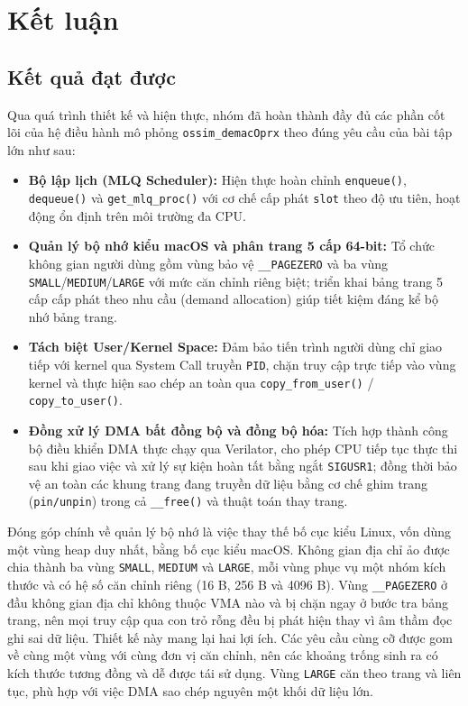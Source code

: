 \documentclass[12pt,a4paper]{article}
\begin{document}
	\section{Kết luận}
	\subsection*{Kết quả đạt được}
    Qua quá trình thiết kế và hiện thực, nhóm đã hoàn thành đầy đủ các phần cốt lõi của hệ điều hành mô phỏng \texttt{ossim\_demacOprx} theo đúng yêu cầu của bài tập lớn như sau:
    \begin{itemize}
        \item \textbf{Bộ lập lịch (MLQ Scheduler):} Hiện thực hoàn chỉnh \texttt{enqueue()}, \texttt{dequeue()} và \texttt{get\_mlq\_proc()} với cơ chế cấp phát \texttt{slot} theo độ ưu tiên, hoạt động ổn định trên môi trường đa CPU.
        \item \textbf{Quản lý bộ nhớ kiểu macOS và phân trang 5 cấp 64-bit:} Tổ chức không gian người dùng gồm vùng bảo vệ \texttt{\_\_PAGEZERO} và ba vùng \texttt{SMALL}/\texttt{MEDIUM}/\texttt{LARGE} với mức căn chỉnh riêng biệt; triển khai bảng trang 5 cấp cấp phát theo nhu cầu (demand allocation) giúp tiết kiệm đáng kể bộ nhớ bảng trang.
        \item \textbf{Tách biệt User/Kernel Space:} Đảm bảo tiến trình người dùng chỉ giao tiếp với kernel qua System Call truyền \texttt{PID}, chặn truy cập trực tiếp vào vùng kernel và thực hiện sao chép an toàn qua \texttt{copy\_from\_user()} / \texttt{copy\_to\_user()}.
        \item \textbf{Đồng xử lý DMA bất đồng bộ và đồng bộ hóa:} Tích hợp thành công bộ điều khiển DMA thực chạy qua Verilator, cho phép CPU tiếp tục thực thi sau khi giao việc và xử lý sự kiện hoàn tất bằng ngắt \texttt{SIGUSR1}; đồng thời bảo vệ an toàn các khung trang đang truyền dữ liệu bằng cơ chế ghim trang (\texttt{pin/unpin}) trong cả \texttt{\_\_free()} và thuật toán thay trang.
    \end{itemize}

    Đóng góp chính về quản lý bộ nhớ là việc thay thế bố cục kiểu Linux, vốn dùng một vùng heap duy nhất, bằng bố cục kiểu macOS. Không gian địa chỉ ảo được chia thành ba vùng \texttt{SMALL}, \texttt{MEDIUM} và \texttt{LARGE}, mỗi vùng phục vụ một nhóm kích thước và có hệ số căn chỉnh riêng (16 B, 256 B và 4096 B). Vùng \texttt{\_\_PAGEZERO} ở đầu không gian địa chỉ không thuộc VMA nào và bị chặn ngay ở bước tra bảng trang, nên mọi truy cập qua con trỏ rỗng đều bị phát hiện thay vì âm thầm đọc ghi sai dữ liệu. Thiết kế này mang lại hai lợi ích. Các yêu cầu cùng cỡ được gom về cùng một vùng với cùng đơn vị căn chỉnh, nên các khoảng trống sinh ra có kích thước tương đồng và dễ được tái sử dụng. Vùng \texttt{LARGE} căn theo trang và liên tục, phù hợp với việc DMA sao chép nguyên một khối dữ liệu lớn.
\end{document}
